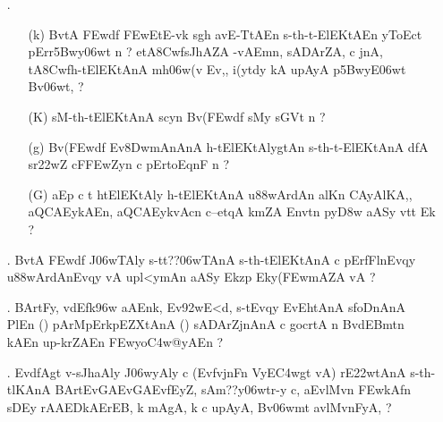 \def\DevnagVersion{2.15}\documentclass{article}
\begin{document}
\begin{itemize}
\item[{\dn \dnnum \rn{25}}.] \begin{itemize}
               
               \item[({\dn k})] {\dn BvtA\2 \3FEwd\?f\? \3FEwEtE-vk\? s\2g\5h\? avE-TtAEn s\2-th-t{\rs -\re}ElEKtAEn yToEct\2 pErr\35Bwy\306wt\? n {\rs ?\re} etA\38Cwfs\2JhAZA\2 -vAEmn, sADArZA, c jnA, tA\38Cwfh-tElEKtAnA\2 mh\306w(v\2 Ev,{\rs ,\re} i(y\?tdy\?{\qvb} kA upAyA p\35BwyE\306wt Bv\306wt, {\rs ?\re}}
               
               \item[({\dn K})] {\dn sM-th-tElEKtAnA\2 s\2cyn\2 Bv(\3FEwd\?f\? sMy s\2GVt\2 n {\rs ?\re}}
               
               \item[({\dn g})] {\dn Bv(\3FEwd\?f\? Ev\38DwmAnAnA\2 h-tElEKtAlygtAn\2 s\2-th-t{\rs -\re}ElEKtAnA\2 dfA s\2r\322wZ\? cF\3FEwZyn\? c pErtoEqnF n {\rs ?\re}} 
               
               \item[({\dn G})] {\dn aEp c t\? ht\0ElEKtAly\? h-tElEKtAnA u\388wArdAn al\?Kn CAyAl\?KA,{\rs ,\re} aQCAEykAEn{\rs ,\re} aQCAEykvAcn\2 c{\rs --\re}et\?qA\2 km\0ZA\2 Env\0t\0n\? py\0\3D8w aASy\2 vt\0t\? Ek {\rs ?\re}}
               \end{itemize}

\item[{\dn \dnnum \rn{26}}.] {\dn BvtA\2 \3FEwd\?f\? J\306wTAly\0 s\2-tt{\rs ??\re}\306wTAnA\2 s\2-th-tElEKtAnA\2 c pErfFlnEvqy\? u\388wArdAnEvqy\? vA upl<ymAn aASy\2 Ek\2zp\2 Eky(\3FEwmAZA\2 vA {\rs ?\re} }

\item[{\dn \dnnum \rn{27}}.] {\dn BArtFy\4, v\4d\?Efk\4\396w aAEnk\4, Ev\392wE<d, s\2-tEvqy\? EvEhtAnA\2 s\2foDnAnA\2 PlEn {\rs (\re}{\dn\dnnum {}}{\rs )\re} pArMpErkpEZXtAnA\2 {\rs (\re}{\dn \dnnum {}}{\rs )\re} sADArZjnAnA\2 c gocrtA\2 n\?\2 BvdEBmt\?n kAEn up-krZAEn \3FEwyo\3C4w@yAEn {\rs ?\re}}

\item[{\dn \dnnum \rn{28}}.] {\dn Evd\?fAgt\? v-s\2JhaAly\? J\306wyAly\? c {\rs (\re}EvfvjnFn\? VyE\3C4wgt\? vA{\rs )\re} rE\322wtAnA\2 s\2-th-tl\?KAnA\2{\rs ,\re} BArtEvGAEvGAEvfEyZ, sAm{\rs ??\re}y\306wtr-y c{\rs ,\re} aEvlMv\?n \3FEwkAfn\2 sDEy\2 rAAEDkAErEB, k\? mAgA\0, k\? c upAyA, Bv\306wmt\? avlMvnFyA, {\rs ?\re}}

\end{itemize}
\end{document}

